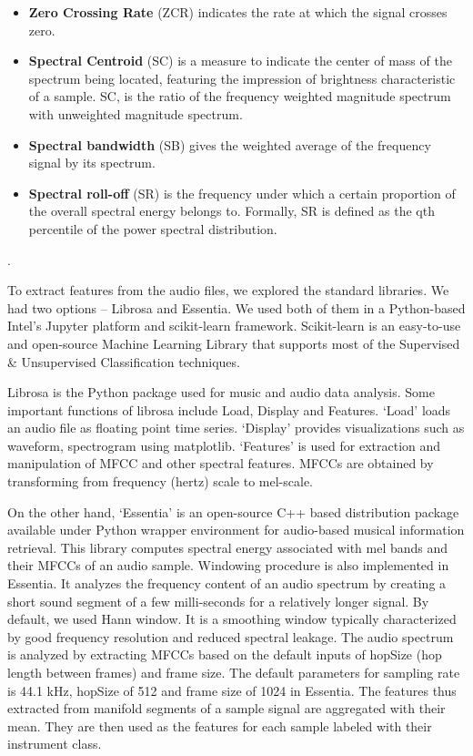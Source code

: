 \documentclass[conference]{IEEEtran}
\begin{document}
\begin{itemize}
	\item \textbf{Zero Crossing Rate} (ZCR) indicates the rate at which the signal crosses zero.
	\item \textbf{Spectral Centroid} (SC) is a measure to indicate the center of mass of the spectrum being located, featuring the impression of brightness characteristic of a sample.  SC\cite{zhang2001audio}, is the ratio of the frequency weighted 	magnitude spectrum with unweighted magnitude spectrum.
	\item \textbf{Spectral bandwidth} (SB) gives the weighted average of the frequency signal by its spectrum.
	\item \textbf{Spectral roll-off} (SR) is the frequency under which a certain proportion of the overall spectral energy belongs to. Formally, SR is defined as the qth percentile
	of the power spectral distribution. 
\end{itemize}.  

To extract features from the audio files, we explored the standard libraries. We had two options -- Librosa\cite{mcfee2015librosa} and Essentia\cite{esen}. We used both of them in a Python-based Intel’s Jupyter platform and scikit-learn \cite{scikit} framework. Scikit-learn is an easy-to-use and open-source Machine Learning Library that supports most of the Supervised \& Unsupervised  Classification techniques.

Librosa is the Python package used for music and audio data analysis. Some important functions of librosa include Load, Display and Features. `Load' loads an audio file as floating point time series. `Display' provides visualizations such as waveform, spectrogram using matplotlib. `Features' is used for extraction and manipulation of MFCC and other spectral features. MFCCs are obtained by transforming from frequency (hertz) scale to mel-scale.

On the other hand, `Essentia' is an open-source C++ based distribution package available under Python wrapper environment for audio-based musical information retrieval. This library computes spectral energy associated with mel bands and their MFCCs of an audio sample. Windowing procedure is also implemented in Essentia. It analyzes the frequency content of an audio spectrum by creating a short sound segment of a few milli-seconds for a relatively longer signal. By default, we used Hann window\cite{esen}. It is a smoothing window typically characterized by good frequency resolution and reduced spectral leakage. The audio spectrum is analyzed by extracting MFCCs based on the default inputs of hopSize (hop length between frames) and frame size. The default parameters for sampling rate is 44.1 kHz, hopSize of 512 and frame size of 1024 in Essentia. The features thus extracted from manifold segments of a sample signal are aggregated with their mean. They are then used as the features for each sample labeled with their instrument class.
\end{document}
